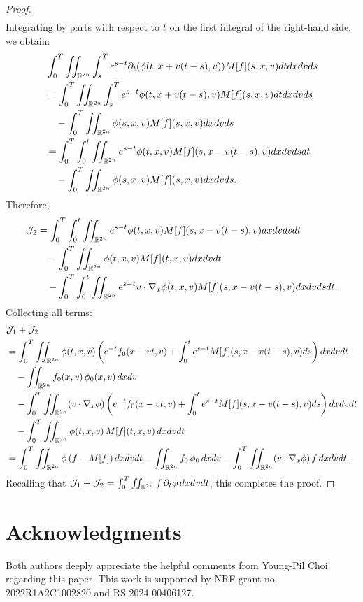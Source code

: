 \documentclass{amsart}
\theoremstyle{plain}
\theoremstyle{remark}
\numberwithin{equation}{section}
\newcommand{\calJ}{\mathcal J}
\newcommand{\p}{\partial}
\newcommand{\R}{\mathbb{R}}
\newcommand{\dx}{\textnormal{d}x}
\newcommand{\dv}{\textnormal{d}v}
\newcommand{\dt}{\textnormal{d}t}
\newcommand{\ds}{\textnormal{d}s}
\begin{document}
\begin{proof}
\begin{align*}
\end{align*}
Integrating by parts with respect to $t$ on the first integral of the right-hand side, we obtain:
\begin{align*}
    &\int_0^T \iint_{\R^{2n}} \int_{s}^T e^{s-t} \p_t (\phi(t,x+v(t-s),v)) M[f](s,x,v)\dt\dx\dv\ds \\
    &= \int_0^T \iint_{\R^{2n}} \int_s^T e^{s-t} \phi(t,x+v(t-s),v) M[f](s,x,v)\dt\dx\dv\ds\\
    &\quad - \int_0^T \iint_{\R^{2n}} \phi(s,x,v) M[f](s,x,v) \dx\dv\ds \\
    &= \int_0^T \int_0^t \iint_{\R^{2n}} e^{s-t} \phi(t,x,v) M[f](s,x-v(t-s),v) \dx\dv\ds\dt \\
    &\quad - \int_0^T \iint_{\R^{2n}} \phi(s,x,v) M[f](s,x,v) \dx\dv\ds .
\end{align*}
Therefore,
\begin{align*}
    \calJ_2 &= \int_0^T \int_0^t \iint_{\R^{2n}} e^{s-t}\phi(t,x,v) M[f](s,x-v(t-s),v)\dx\dv\ds\dt \\
    &\quad - \int_0^T \iint_{\R^{2n}}\phi(t,x,v) M[f](t,x,v)\dx\dv\dt \\
    &\quad - \int_0^T \int_0^t \iint_{\R^{2n}} e^{s-t} v\cdot \nabla_x\phi(t,x,v) M[f](s,x-v(t-s),v) \dx\dv\ds\dt.
\end{align*}
Collecting all terms:
{\small\begin{align*}
    &\calJ_1 + \calJ_2 \\
    &= \int_0^T \iint_{\R^{2n}} \phi(t,x,v)\left(e^{-t}f_0(x-vt,v) + \int_0^t e^{s-t} M[f](s,x-v(t-s),v)\ds \right) \dx\dv\dt \\
    &\quad - \iint_{\R^{2n}} f_0(x,v) \,\phi_0(x,v)\,\dx\dv \\
    &\quad -\int_0^T \iint_{\R^{2n}} (v\cdot \nabla_x\phi) \left(e^{-t} f_0(x-vt,v) + \int_0^t e^{s-t} M[f](s,x-v(t-s),v) \ds\right)\dx\dv\dt \\
    &\quad - \int_0^T \iint_{\R^{2n}} \phi(t,x,v) \, M[f](t,x,v)\,\dx\dv\dt \\
    &= \int_0^T \iint_{\R^{2n}} \phi \, (f - M[f]) \,\dx\dv\dt - \iint_{\R^{2n}} f_0 \,\phi_0\,\dx\dv - \int_0^T \iint_{\R^{2n}} (v\cdot \nabla_x \phi) \,f \,\dx\dv\dt .
\end{align*}}
Recalling that $\calJ_1 + \calJ_2 = \int_0^T \iint_{\R^{2n}} f\,\p_t\phi\,\dx\dv\dt$, this completes the proof.
\end{proof}



\section*{Acknowledgments} Both authors deeply appreciate the helpful comments from Young-Pil Choi regarding this paper. This work is supported by NRF grant no. 2022R1A2C1002820 and RS-2024-00406127.
\end{document}
